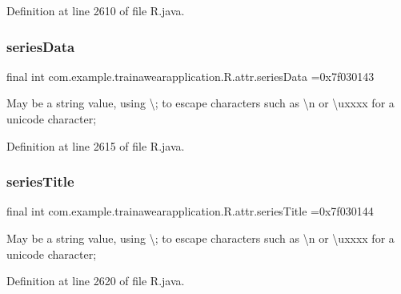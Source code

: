Definition at line 2610 of file R.\+java.

\mbox{\label{classcom_1_1example_1_1trainawearapplication_1_1_r_1_1attr_a788cc2e11455a49624bb42633d8feddf}} 
\subsubsection{\texorpdfstring{seriesData}{seriesData}}
{\footnotesize\ttfamily final int com.\+example.\+trainawearapplication.\+R.\+attr.\+series\+Data =0x7f030143\hspace{0.3cm}{\ttfamily [static]}}

May be a string value, using \textquotesingle{}\textbackslash{};\textquotesingle{} to escape characters such as \textquotesingle{}\textbackslash{}n\textquotesingle{} or \textquotesingle{}\textbackslash{}uxxxx\textquotesingle{} for a unicode character; 

Definition at line 2615 of file R.\+java.

\mbox{\label{classcom_1_1example_1_1trainawearapplication_1_1_r_1_1attr_abe5f353990d4f61057aeaa3fb61d1df8}} 
\subsubsection{\texorpdfstring{seriesTitle}{seriesTitle}}
{\footnotesize\ttfamily final int com.\+example.\+trainawearapplication.\+R.\+attr.\+series\+Title =0x7f030144\hspace{0.3cm}{\ttfamily [static]}}

May be a string value, using \textquotesingle{}\textbackslash{};\textquotesingle{} to escape characters such as \textquotesingle{}\textbackslash{}n\textquotesingle{} or \textquotesingle{}\textbackslash{}uxxxx\textquotesingle{} for a unicode character; 

Definition at line 2620 of file R.\+java.


